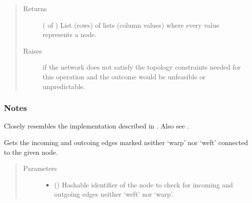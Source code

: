 \documentclass[letterpaper,10pt,english]{sphinxmanual}
\begin{document}
\begin{fulllineitems}
\begin{fulllineitems}
\begin{quote}
\begin{description}
\item[{Returns}] \leavevmode
{} ( of ) \textendash{} List (rows) of lists (column values) where every value represents
a node.

\item[{Raises}] \leavevmode
{\hyperref[\detokenize{cockatoo:cockatoo.exception.KnitNetworkTopologyError}]{}} \textendash{} if the network does not satisfy the topology constraints needed for
    this operation and the outcome would be unfeasible or
    unpredictable.

\end{description}\end{quote}
\subsubsection*{Notes}

Closely resembles the implementation described in  \sphinxfootnotemark[1]. Also see
 \sphinxfootnotemark[2].

\end{fulllineitems}


\begin{fulllineitems}
\label{\detokenize{cockatoo:cockatoo.KnitDiNetwork.node_contour_edges}}
Gets the incoming and outcoing edges marked neither ‘warp’ nor ‘weft’
connected to the given node.
\begin{quote}\begin{description}
\item[{Parameters}] \leavevmode\begin{itemize}
\item {} 
 () \textendash{} Hashable identifier of the node to check for incoming and outgoing
edges neither ‘weft’ nor ‘warp’.


\end{itemize}
\end{description}
\end{quote}
\end{fulllineitems}
\end{fulllineitems}
\end{document}

